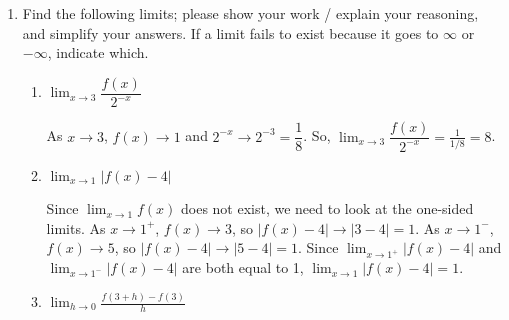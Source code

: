 \documentclass{article}
\theoremstyle{theorem}
\begin{document}
\begin{enumerate}
\begin{enumerate}
    \begin{solution}
      $f$ is discontinuous at $x = -1, 1, 2$, so it's not differentiable there by {{\#4}} on \href{https://canvas.harvard.edu/courses/138327/files/20921670?wrap=1}{the worksheet ``Continuity''}. Also, the graph has a corner at $x = 3$, so $f$ isn't differentiable there. So, $f$ is not differentiable at $x = \boxed{-1, 1, 2, 3}$. 
    \end{solution}

  \item %

    Find the following limits; please show your work / explain your reasoning, and simplify your answers. If a limit fails to exist because it goes to $\infty$ or $-\infty$, indicate which.

    \begin{enumerate}
    \item
      \begin{problem}[\vfill]
        $\displaystyle \lim_{x \to 3} \dfrac{f(x)}{2^{-x}}$
      \end{problem}

      \begin{solution}
        As $x \to 3$, $f(x) \to 1$ and $2^{-x} \to 2^{-3} = \dfrac{1}{8}$. So, $\displaystyle \lim_{x \to 3} \dfrac{f(x)}{2^{-x}} = \frac{1}{1/8} = \boxed{8}$. 
      \end{solution}

    \item
      \begin{problem}[\vfill]
        $\displaystyle \lim_{x \to 1} |f(x) - 4|$
      \end{problem}

      \begin{solution}
        Since $\displaystyle \lim_{x \to 1} f(x)$ does not exist, we need to look at the one-sided limits. As $x \to 1^+$, $f(x) \to 3$, so $|f(x) - 4| \to |3 - 4| = 1$. As $x \to 1^-$, $f(x) \to 5$, so $|f(x) - 4| \to |5 - 4| = 1$. Since $\displaystyle \lim_{x \to 1^+} |f(x) - 4|$ and $\displaystyle \lim_{x \to 1^-} |f(x) - 4|$ are both equal to 1, $\displaystyle \lim_{x \to 1} |f(x) - 4| = \boxed{1}$. 
      \end{solution}

    \item
      \begin{problem}[\vfill\newpage]
        $\displaystyle \lim_{h \to 0} \frac{f(3 + h) - f(3)}{h}$
      \end{problem}


\end{enumerate}
\end{enumerate}
\end{enumerate}
\end{document}

